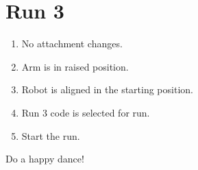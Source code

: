 \documentclass[letter, article]{article}
\begin{document}
\section{Run 3}

\begin{enumerate}
    \item No attachment changes.
    \item Arm is in raised position.
    \item Robot is aligned in the starting position.
    \item Run 3 code is selected for run.
    \item Start the run.
\end{enumerate}

\begin{tcolorbox}[title=Note:]
Do a happy dance!
\end{tcolorbox}
\end{document}
